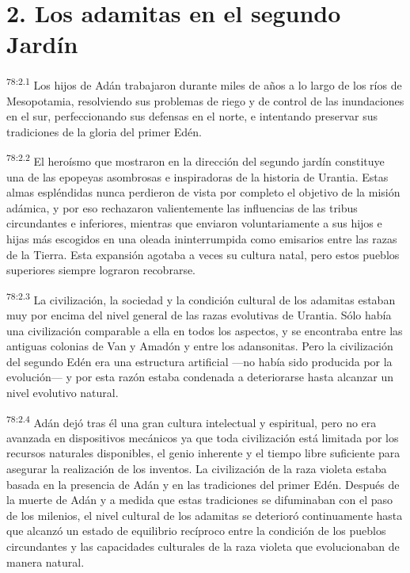 \section*{2. Los adamitas en el segundo Jardín}
\par
\textsuperscript{78:2.1} Los hijos de Adán trabajaron durante miles de años a lo largo de los ríos de Mesopotamia, resolviendo sus problemas de riego y de control de las inundaciones en el sur, perfeccionando sus defensas en el norte, e intentando preservar sus tradiciones de la gloria del primer Edén.

\par
\textsuperscript{78:2.2} El heroísmo que mostraron en la dirección del segundo jardín constituye una de las epopeyas asombrosas e inspiradoras de la historia de Urantia. Estas almas espléndidas nunca perdieron de vista por completo el objetivo de la misión adámica, y por eso rechazaron valientemente las influencias de las tribus circundantes e inferiores, mientras que enviaron voluntariamente a sus hijos e hijas más escogidos en una oleada ininterrumpida como emisarios entre las razas de la Tierra. Esta expansión agotaba a veces su cultura natal, pero estos pueblos superiores siempre lograron recobrarse.

\par
\textsuperscript{78:2.3} La civilización, la sociedad y la condición cultural de los adamitas estaban muy por encima del nivel general de las razas evolutivas de Urantia. Sólo había una civilización comparable a ella en todos los aspectos, y se encontraba entre las antiguas colonias de Van y Amadón y entre los adansonitas. Pero la civilización del segundo Edén era una estructura artificial ---no había sido producida por la evolución--- y por esta razón estaba condenada a deteriorarse hasta alcanzar un nivel evolutivo natural.

\par
\textsuperscript{78:2.4} Adán dejó tras él una gran cultura intelectual y espiritual, pero no era avanzada en dispositivos mecánicos ya que toda civilización está limitada por los recursos naturales disponibles, el genio inherente y el tiempo libre suficiente para asegurar la realización de los inventos. La civilización de la raza violeta estaba basada en la presencia de Adán y en las tradiciones del primer Edén. Después de la muerte de Adán y a medida que estas tradiciones se difuminaban con el paso de los milenios, el nivel cultural de los adamitas se deterioró continuamente hasta que alcanzó un estado de equilibrio recíproco entre la condición de los pueblos circundantes y las capacidades culturales de la raza violeta que evolucionaban de manera natural.


